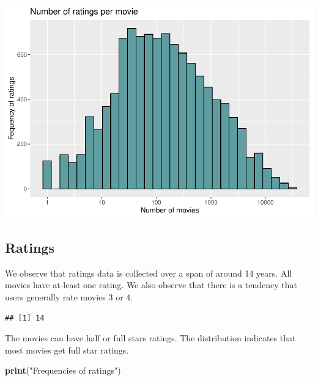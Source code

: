 \documentclass[]{article}
\newenvironment{Shaded}{\begin{snugshade}}{\end{snugshade}}
\newcommand{\DataTypeTok}[1]{\textcolor[rgb]{0.13,0.29,0.53}{#1}}
\newcommand{\KeywordTok}[1]{\textcolor[rgb]{0.13,0.29,0.53}{\textbf{#1}}}
\newcommand{\NormalTok}[1]{#1}
\newcommand{\OperatorTok}[1]{\textcolor[rgb]{0.81,0.36,0.00}{\textbf{#1}}}
\newcommand{\StringTok}[1]{\textcolor[rgb]{0.31,0.60,0.02}{#1}}
\begin{document}
\includegraphics{Project_MovieLens_files/figure-latex/unnamed-chunk-12-1.pdf}

\subsection{Ratings}
\label{sec:ratings}

We observe that ratings data is collected over a span of around 14
years. All movies have at-least one rating. We also observe that there
is a tendency that users generally rate movies 3 or 4.

\begin{Shaded}
\end{Shaded}

\begin{verbatim}
## [1] 14
\end{verbatim}

The movies can have half or full stars ratings. The distribution
indicates that most movies get full star ratings.

\begin{Shaded}
\begin{Highlighting}[]
\KeywordTok{print}\NormalTok{(}\StringTok{"Frequencies of ratings"}\NormalTok{)}
\end{Highlighting}
\end{Shaded}
\end{document}
